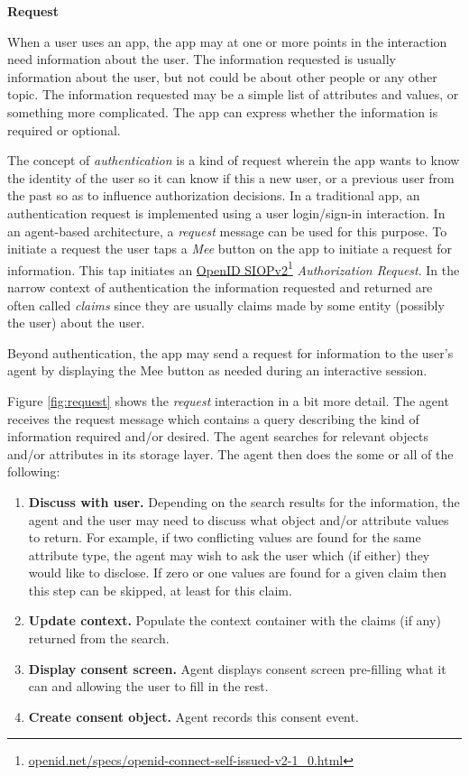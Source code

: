 \documentclass[11pt, oneside]{article}   	%
\newcommand{\hyperfootnote}[1][]{\def\ArgI{{#1}}\hyperfootnoteRelay}
\newcommand\hyperfootnoteRelay[2][]{\href{#1#2}{\ArgI}\footnote{\href{#1#2}{#2}}}
\begin{document}
\textbf{Request}

When a user uses an app, the app may at one or more points in the interaction need information about the user. The information requested is usually information about the user, but not could be about other people or any other topic. The information requested may be a simple list of attributes and values, or something more complicated. The app can express whether the information is required or optional.

The concept of \emph{authentication} is a kind of request wherein the app wants to know the identity of the user so it can know if this a new user, or a previous user from the past so as to influence authorization decisions. In a traditional app, an authentication request is implemented using a user login/sign-in interaction. In an agent-based architecture, a \emph{request} message can be used for this purpose. To initiate a request the user taps a \emph{Mee} button on the app to initiate a request for information. This tap initiates an \hyperfootnote[OpenID SIOPv2][https://]{openid.net/specs/openid-connect-self-issued-v2-1\_0.html} \emph{Authorization Request}. In the narrow context of authentication the information requested and returned are often called \emph{claims} since they are usually claims made by some entity (possibly the user) about the user.

Beyond authentication, the app may send a request for information to the user's agent by displaying the Mee button as needed during an interactive session. 

Figure \ref{fig:request} shows the \emph{request} interaction in a bit more detail. The agent receives the request message which contains a query describing the kind of information required and/or desired. The agent searches for relevant objects and/or attributes in its storage layer. The agent then does the some or all of the following:
\begin{enumerate}
	\item \textbf{Discuss with user.} Depending on the search results for the information, the agent and the user may need to discuss what object and/or attribute values to return. For example, if two conflicting values are found for the same attribute type, the agent may wish to ask the user which (if either) they would like to disclose. If zero or one values are found for a given claim then this step can be skipped, at least for this claim.
	\item \textbf{Update context.} Populate the context container with the claims (if any) returned from the search.
	\item \textbf{Display consent screen.} Agent displays consent screen pre-filling what it can and allowing the user to fill in the rest. 
	\item \textbf {Create consent object.} Agent records this consent event.
\end{enumerate}
\end{document}
